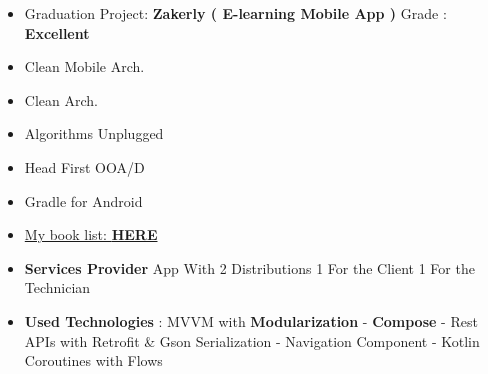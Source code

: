\documentclass[10pt,a4paper,ragged2e,withhyper]{altacv}
\begin{document}
\begin{paracol}{2}
{\begin{itemize}
        \end{itemize}}


        \begin{itemize}
            \item Graduation Project: \textbf{Zakerly ( E-learning Mobile App )} Grade : \textbf{Excellent}
        \end{itemize}


        \begin{multicols}{3}

        {\small\begin{itemize}
                   \item[\textcolor{PrimaryColor}{\faBook}] Clean Mobile Arch.
                   \item[\textcolor{PrimaryColor}{\faBook}] Clean Arch.
                   \item[\textcolor{PrimaryColor}{\faBook}] Algorithms Unplugged
                   \item[\textcolor{PrimaryColor}{\faBook}] Head First OOA/D
                   \item[\textcolor{PrimaryColor}{\faBook}] Gradle for Android
                   \item[\textcolor{PrimaryColor}{\faTrello}] \href{https://trello.com/b/pkZlgQVu/my-readings-board}{My book list: \textbf{\textcolor{TertiaryColor}{HERE}}}
        \end{itemize}}

        \end{multicols}

    \end{paracol}

    \vspace{2px}

    \vspace{2px}


    \hypertarget{samoolah}{}
    \begin{itemize}
        \item \textbf{Services Provider} App With 2 Distributions 1 For the Client 1 For the Technician
        \item \textbf{Used Technologies} : MVVM with \textbf{Modularization} - \textbf{Compose} - Rest APIs with Retrofit \& Gson Serialization - Navigation Component - Kotlin Coroutines with Flows
    \end{itemize}
    \divider
\end{document}
